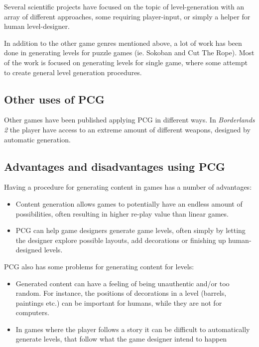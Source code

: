 \documentclass[a4paper,titlepage,final]{report}
\begin{document}
Several scientific projects have focused on the topic of level-generation with an array of different approaches, some requiring player-input, or simply a helper for human level-designer.

In addition to the other game genres mentioned above, a lot of work has been done in generating levels for puzzle games (ie. Sokoban and Cut The Rope).
Most of the work is focused on generating levels for single game, where some attempt to create general level generation procedures.


\subsection{Other uses of PCG}
Other games have been published applying PCG in different ways. In \textit{Borderlands 2} \citeyearpar{game:borderlands} the player have access to an extreme amount of different weapons, designed by automatic generation.


\subsection{Advantages and disadvantages using PCG}

Having a procedure for generating content in games has a number of advantages:

\begin{itemize}
  \item Content generation allows games to potentially have an endless amount of possibilities, often resulting in higher re-play value than linear games. 
  \item PCG can help game designers generate game levels, often simply by letting the designer explore possible layouts, add decorations or finishing up human-designed levels.
\end{itemize}

PCG also has some problems for generating content for levels:

\begin{itemize}
  \item Generated content can have a feeling of being unauthentic and/or too random. For instance, the positions of decorations in a level (barrels, paintings etc.) can be important for humans, while they are not for computers.
  \item In games where the player follows a story it can be difficult to automatically generate levels, that follow what the game designer intend to happen%
\end{itemize}
\end{document}
